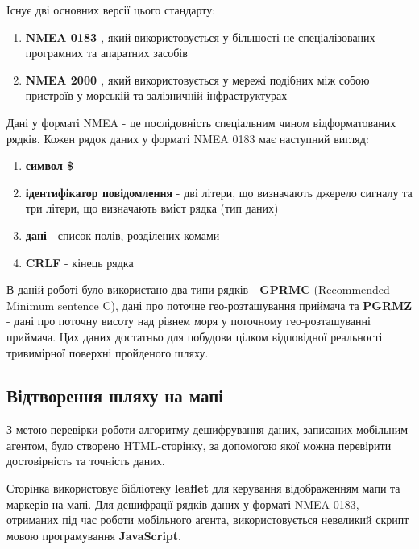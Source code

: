 \documentclass[simple,a4paper,14pt,ukrainian,utf8]{eskdtext}
\begin{document}
    Існує дві основних версії цього стандарту:
    
    \begin{enumerate}
    	\item \textbf{NMEA 0183 \cite{website:nmea_0183}}, який використовується у більшості не спеціалізованих програмних та апаратних засобів
    	\item \textbf{NMEA 2000 \cite{website:nmea_2000}}, який використовується у мережі подібних між собою пристроїв у морській та залізничній інфраструктурах
    \end{enumerate}
    
    Дані у форматі NMEA - це послідовність спеціальним чином відформатованих рядків. Кожен рядок даних у форматі NMEA 0183 має наступний вигляд:
    
    \begin{enumerate}
    	\item \textbf{символ \$}
		\item \textbf{ідентифікатор повідомлення} - дві літери, що визначають джерело сигналу та три літери, що визначають вміст рядка (тип даних)
		\item \textbf{дані} - список полів, розділених комами
		\item \textbf{CRLF} - кінець рядка
    \end{enumerate}
    
    В даній роботі було використано два типи рядків - \textbf{GPRMC} (Recommended Minimum sentence C), дані про поточне гео-розташування приймача та \textbf{PGRMZ} - дані про поточну висоту над рівнем моря у поточному гео-розташуванні приймача. Цих даних достатньо для побудови цілком відповідної реальності тривимірної поверхні пройденого шляху.

	\newpage
	
    \subsection{Відтворення шляху на мапі}
    
    З метою перевірки роботи алгоритму дешифрування даних, записаних мобільним агентом, було створено HTML-сторінку, за допомогою якої можна перевірити достовірність та точність даних.
    
    Сторінка використовує бібліотеку \textbf{leaflet} для керування відображенням мапи та маркерів на мапі. Для дешифрації рядків даних у форматі NMEA-0183, отриманих під час роботи мобільного агента, використовується невеликий скрипт мовою програмування \textbf{JavaScript}.
    
\end{document}
